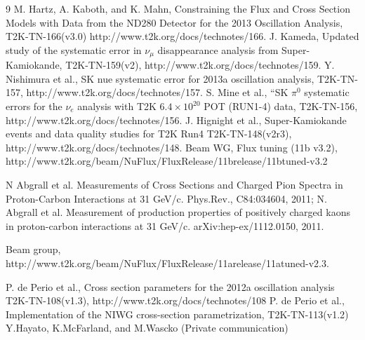 \begin{thebibliography}{9}
  M. Hartz, A. Kaboth, and K. Mahn,
  Constraining the Flux and Cross Section Models with Data from the
  ND280 Detector for the 2013 Oscillation Analysis,
  T2K-TN-166(v3.0)
  http://www.t2k.org/docs/technotes/166.
   J. Kameda,
   Updated study of the systematic error in $\nu_{\mu}$ disappearance analysis from Super-Kamiokande,
   T2K-TN-159(v2),
   http://www.t2k.org/docs/technotes/159.
   Y. Nishimura et al.,
   SK nue systematic error for 2013a oscillation analysis,
   T2K-TN-157,
   http://www.t2k.org/docs/technotes/157.
   S. Mine et al.,
   “SK $\pi^{0}$ systematic errors for the $\nu_{e}$ analysis with T2K $6.4\times 10^{20}$ POT (RUN1-4) data,
   T2K-TN-156,
   http://www.t2k.org/docs/technotes/156.
   J. Hignight et al.,
   Super-Kamiokande events and data quality studies for T2K Run4
   T2K-TN-148(v2r3),
   http://www.t2k.org/docs/technotes/148.
   Beam WG, Flux tuning (11b v3.2), 
http://www.t2k.org/beam/NuFlux/FluxRelease/11brelease/11btuned-v3.2

  N Abgrall et al. Measurements of Cross Sections and Charged Pion Spectra in Proton-Carbon Interactions
  at 31 GeV/c. Phys.Rev., C84:034604, 2011;
  N. Abgrall et al. Measurement of production properties of positively charged kaons in proton-carbon
  interactions at 31 GeV/c. arXiv:hep-ex/1112.0150, 2011.

  Beam group,
  http://www.t2k.org/beam/NuFlux/FluxRelease/11arelease/11atuned-v2.3.

  P. de Perio et al.,
  Cross section parameters for the 2012a oscillation analysis
  T2K-TN-108(v1.3),
  http://www.t2k.org/docs/technotes/108
  P. de Perio et al.,
  Implementation of the NIWG cross-section parametrization,
  T2K-TN-113(v1.2) 
  Y.Hayato, K.McFarland, and M.Wascko (Private communication) 

%                                                                                                                                                     
%                                           
                                                                                                          

\end{thebibliography}
